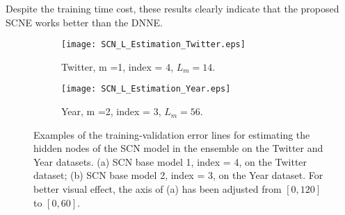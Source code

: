 \documentclass{article}
\begin{document}
Despite the training time cost, these results clearly indicate that the proposed SCNE works better than the DNNE.
\begin{figure}[!h]
\centering
    \begin{subfigure}[b]{0.49\textwidth}
        \texttt{[image: SCN\_L\_Estimation\_Twitter.eps]}
        \caption{Twitter, m =1, index = 4, $L_m = 14$.}
        \label{}    
    \end{subfigure}
    \begin{subfigure}[b]{0.49\textwidth}
        \texttt{[image: SCN\_L\_Estimation\_Year.eps]}
        \caption{Year, m =2, index = 3, $L_m = 56$.}
        \label{}    
    \end{subfigure}      
\caption{Examples of the training-validation error lines for estimating the hidden nodes of the SCN model in the ensemble on the Twitter and Year datasets. (a) SCN base model 1, index = 4, on the Twitter dataset; (b) SCN base model 2, index = 3, on the Year dataset. For better visual effect, the axis of (a) has been adjusted from $[0, 120]$ to $[0, 60]$.}
\label{Fig07}
\end{figure} 
\end{document}

